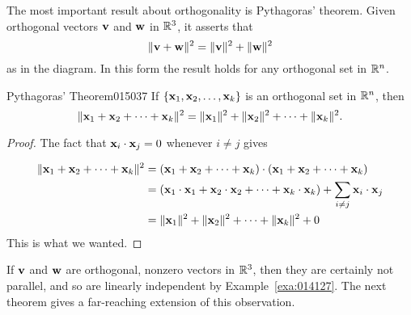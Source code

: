 \begin{wrapfigure}[6]{l}{4.5cm} 
\vspace*{-2em}
\centering

\end{wrapfigure}

The most important result about orthogonality is Pythagoras' theorem. Given orthogonal vectors $\textbf{v}$ and $\textbf{w}$ in $\mathbb{R}^3$, it asserts that 
\begin{equation*}
\|\textbf{v} + \textbf{w}\|^{2} = \|\textbf{v}\|^{2} + \|\textbf{w}\|^{2}
\end{equation*}
 as in the diagram. In this form the result holds for any orthogonal set in $\mathbb{R}^n$.

\begin{theorem}{Pythagoras' Theorem}{015037} %
If $\{\textbf{x}_{1}, \textbf{x}_{2}, \dots, \textbf{x}_{k}\}$ is an orthogonal set in $\mathbb{R}^n$, then
\begin{equation*}
\|\textbf{x}_1 + \textbf{x}_2 + \dots + \textbf{x}_k \|^2 = \|\textbf{x}_1\|^2 + \|\textbf{x}_2\|^2 + \dots + \|\textbf{x}_k\|^2.
\end{equation*}
\end{theorem}

\begin{proof}
The fact that $\textbf{x}_{i} \cdot \textbf{x}_{j} = 0$ whenever $i \neq j$ gives

\newpage
\begin{align*}
\|\textbf{x}_1 + \textbf{x}_2 + \dots + \textbf{x}_k \|^2 & =
(\textbf{x}_1 + \textbf{x}_2 + \dots + \textbf{x}_k) \cdot (\textbf{x}_1 + \textbf{x}_2 + \dots + \textbf{x}_k) \\
&= (\textbf{x}_1 \cdot \textbf{x}_1 + \textbf{x}_2 \cdot \textbf{x}_2 + \dots + \textbf{x}_k \cdot \textbf{x}_k) + \sum_{i \neq j}\textbf{x}_i \cdot \textbf{x}_j \\
&= \|\textbf{x}_1\|^2 + \|\textbf{x}_2\|^2 + \dots + \|\textbf{x}_k\|^2 + 0
\end{align*} 
This is what we wanted.
\end{proof} 

If $\textbf{v}$ and $\textbf{w}$ are orthogonal, nonzero vectors in $\mathbb{R}^3$, then they are certainly not parallel, and so are linearly independent by Example~\ref{exa:014127}. The next theorem gives a far-reaching extension of this observation.

